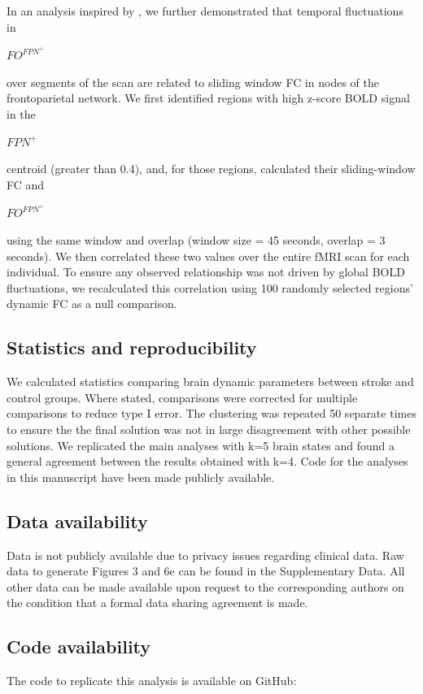 \documentclass[phd,tocprelim]{cornell}
\begin{document}
    In an analysis inspired by \cite{Baker2014-zt}, we further demonstrated that temporal fluctuations in  \begin{Large}$FO^{FPN^+}$ \end{Large} over segments of the scan are related to sliding window FC in nodes of the frontoparietal network. We first identified regions with high z-score BOLD signal in the  \begin{Large}$FPN^+$ \end{Large} centroid (greater than 0.4), and, for those regions, calculated their sliding-window FC and  \begin{Large}$FO^{FPN^+}$ \end{Large} using the same window and overlap (window size = 45 seconds, overlap = 3 seconds). We then correlated these two values over the entire fMRI scan for each individual. To ensure any observed relationship was not driven by global BOLD fluctuations, we recalculated this correlation using 100 randomly selected regions' dynamic FC as a null comparison.
    
    \subsection*{Statistics and reproducibility}
    We calculated statistics comparing brain dynamic parameters between stroke and control groups. Where stated, comparisons were corrected for multiple comparisons to reduce type I error. The clustering was repeated 50 separate times to ensure the the final solution was not in large disagreement with other possible solutions. We replicated the main analyses with k=5 brain states and found a general agreement between the results obtained with k=4. Code for the analyses in this manuscript have been made publicly available. 
    
	\subsection*{Data availability}
	 Data is not publicly available due to privacy issues regarding clinical data. Raw data to generate Figures 3 and 6e can be found in the Supplementary Data. All other data can be made available upon request to the corresponding authors on the condition that a formal data sharing agreement is made. 

	\subsection*{Code availability}
	 The code to replicate this analysis is available on GitHub: 
	 
\end{document}
